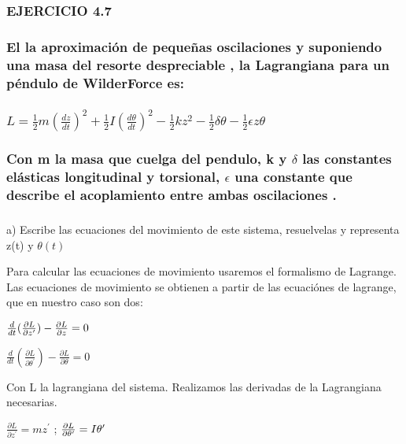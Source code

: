\documentclass[12pt,thmsa]{article}
\begin{document}
\subsubsection{EJERCICIO 4.7}

\subsubsection{El la aproximaci\'{o}n de peque\~{n}as oscilaciones y
suponiendo una masa del resorte despreciable , la Lagrangiana para un
p\'{e}ndulo de WilderForce es:}

\subsubsection{$L=\frac{1}{2}m\left( \frac{dz}{dt}\right) ^{2}+\frac{1}{2}%
I\left( \frac{d\theta }{dt}\right) ^{2}-\frac{1}{2}kz^{2}-\frac{1}{2}\delta
\theta -\frac{1}{2}\epsilon z\theta $}

\subsubsection{Con m la masa que cuelga del pendulo, k y $\delta $ las
constantes el\'{a}sticas longitudinal y torsional, $\epsilon $ una constante
que describe el acoplamiento entre ambas oscilaciones .}

\subsubsection{\protect\vspace{1pt}}

a) Escribe las ecuaciones del movimiento de este sistema, resuelvelas y
representa z(t) y $\theta (t)$

\vspace{1pt}Para calcular las ecuaciones de movimiento usaremos el
formalismo de Lagrange. Las ecuaciones de movimiento se obtienen a partir de
las ecuaci\'{o}nes de lagrange, que en nuestro caso son dos:

$\frac{d}{dt}(\frac{\partial L}{\partial z^{\prime }})-\frac{\partial L}{%
\partial z}=0$

$\frac{d}{dt}(\frac{\partial L}{\partial \theta ^{\prime }})-\frac{\partial L%
}{\partial \theta }=0$

Con L la lagrangiana del sistema. Realizamos las derivadas de la Lagrangiana
necesarias.

$\frac{\partial L}{\partial z^{\prime }}=mz^{\prime }$ ; $\frac{\partial L}{%
\partial \theta ^{\prime }}=I\theta ^{\prime }$
\end{document}
